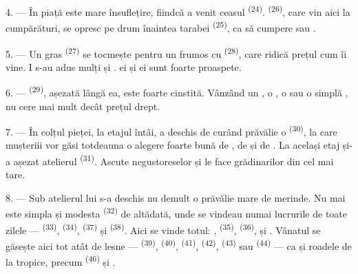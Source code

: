\VUsaut{4.0mm}
\VUsaut{3.0mm}

4. --- În piață este mare însuflețire, fiindcă a venit ceasul 
\textsuperscript{(24)}.  \textsuperscript{(26)}, care vin aici
la cumpărături, se opresc pe drum înaintea tarabei  \textsuperscript{(25)}, ca să cumpere  sau .

5. --- Un  gras \textsuperscript{(27)} se tocmește pentru un
 frumos cu  \textsuperscript{(28)}, care ridică
prețul cum îi vine. I s-au adus mulți  și
.  ei și  ei sunt foarte proaspete.

\VUsaut{4.0mm}
\VUsaut{3.0mm}

6. ---  \textsuperscript{(29)}, așezată lângă ea,
este foarte cinstită. Vânzând un , o , o
 sau o simplă , nu cere mai mult decât prețul drept.

7. --- În colțul pieței, la etajul întâi, a deschis de curând prăvălie o
 \textsuperscript{(30)}, la care mușteriii vor găsi totdeauna o
alegere foarte bună de , de  și de
. La același etaj și-a așezat atelierul
 \textsuperscript{(31)}. Ascute  negustoreselor
și le face grădinarilor  din  cel mai tare.

\VUsaut{4.0mm}
\VUsaut{3.0mm}

8. --- Sub atelierul lui s-a deschis nu demult o prăvălie mare de merinde. Nu mai
este simpla și modesta  \textsuperscript{(32)} de altădată, unde se
vindeau numai lucrurile de toate zilele ---  \textsuperscript{(33)},
 \textsuperscript{(34)}, 
\textsuperscript{(37)} și  \textsuperscript{(38)}. Aici se vinde
totul: ,  \textsuperscript{(35)},
 \textsuperscript{(36)},  și
. Vânatul se găsește aici tot atât de lesne --- 
\textsuperscript{(39)},  \textsuperscript{(40)},
 \textsuperscript{(41)}, 
\textsuperscript{(42)},  \textsuperscript{(43)} sau
 \textsuperscript{(44)} --- ca și roadele de la tropice, precum
 \textsuperscript{(46)} și .

